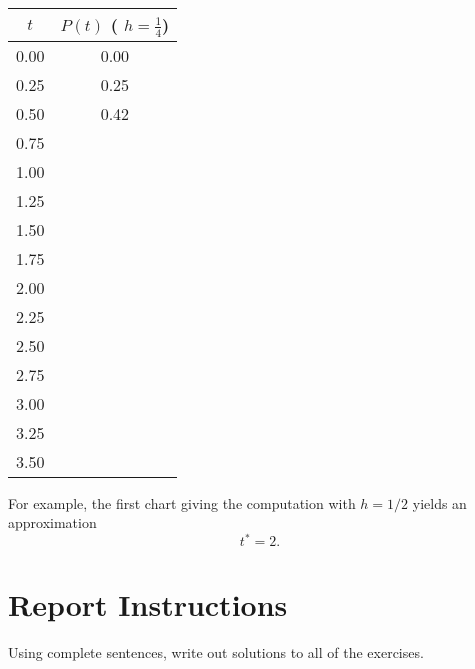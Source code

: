 \begin{minipage}[b]{0.3\textwidth}
  \begin{tabular}{cc}\toprule
    $t$ & $P(t)$  ( $h = \frac14$) \\ \toprule
    0.00 & 0.00 \\ \midrule
    0.25 &  0.25 \\ \midrule
    0.50 & 0.42 \\ \midrule
    0.75 &  \\ \midrule
    1.00 &  \\ \midrule
    1.25 &   \\ \midrule
    1.50 &  \\ \midrule
    1.75 &  \\ \midrule
    2.00 &  \\ \midrule
    2.25 &   \\ \midrule
    2.50 &  \\ \midrule
    2.75 &  \\ \midrule
    3.00 &  \\ \midrule
    3.25 & \\ \midrule
    3.50 & \\ \bottomrule
  \end{tabular}
\end{minipage}

For example, the first chart giving the computation with $h = 1/2$
yields an approximation
\[
t^* = 2.
\]


\noproblemfont


\section*{Report Instructions}
Using complete sentences,
write out solutions to all of the exercises.



